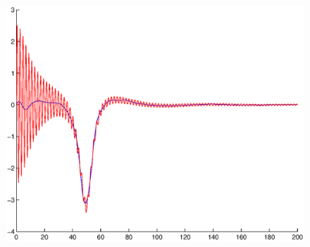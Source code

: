 \documentclass[A4paper,11pt]{article}
\theoremstyle{definition}
\begin{document}
\begin{figure}[H]
\begin{minipage}{.33\textwidth}
  \centering
  \vspace{0.2cm}
  \includegraphics[scale=0.25]{pictures/Example8/Fig4.eps}
  \label{fig:8_4}
\end{minipage}%
\end{figure}
\end{document}
